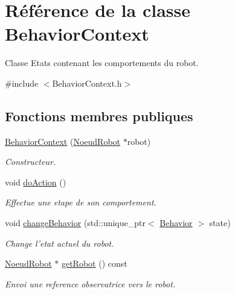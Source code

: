 \hypertarget{class_behavior_context}{\section{Référence de la classe Behavior\-Context}
\label{class_behavior_context}
}


Classe Etats contenant les comportements du robot.  




{\ttfamily \#include $<$Behavior\-Context.\-h$>$}

\subsection*{Fonctions membres publiques}
\begin{DoxyCompactItemize}
\item 
\hypertarget{class_behavior_context_a0fdf61f6304296d6d0b868bc397e0b7b}{\hyperlink{class_behavior_context_a0fdf61f6304296d6d0b868bc397e0b7b}{Behavior\-Context} (\hyperlink{class_noeud_robot}{Noeud\-Robot} $\ast$robot)}\label{class_behavior_context_a0fdf61f6304296d6d0b868bc397e0b7b}

\begin{DoxyCompactList}\small\item\em Constructeur. \end{DoxyCompactList}\item 
\hypertarget{group__inf2990_ga2d15f4d9b398d9b3cb79f790dcf0187f}{void \hyperlink{group__inf2990_ga2d15f4d9b398d9b3cb79f790dcf0187f}{do\-Action} ()}\label{group__inf2990_ga2d15f4d9b398d9b3cb79f790dcf0187f}

\begin{DoxyCompactList}\small\item\em Effectue une etape de son comportement. \end{DoxyCompactList}\item 
\hypertarget{group__inf2990_gab48b5ca95ff1064b51a159e41e68fbaf}{void \hyperlink{group__inf2990_gab48b5ca95ff1064b51a159e41e68fbaf}{change\-Behavior} (std\-::unique\-\_\-ptr$<$ \hyperlink{class_behavior}{Behavior} $>$ state)}\label{group__inf2990_gab48b5ca95ff1064b51a159e41e68fbaf}

\begin{DoxyCompactList}\small\item\em Change l'etat actuel du robot. \end{DoxyCompactList}\item 
\hypertarget{group__inf2990_gab248d4182058e0746819e567d9fecbfb}{\hyperlink{class_noeud_robot}{Noeud\-Robot} $\ast$ \hyperlink{group__inf2990_gab248d4182058e0746819e567d9fecbfb}{get\-Robot} () const }\label{group__inf2990_gab248d4182058e0746819e567d9fecbfb}

\begin{DoxyCompactList}\small\item\em Envoi une reference observatrice vers le robot. \end{DoxyCompactList}\end{DoxyCompactItemize}


